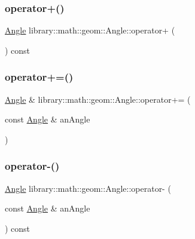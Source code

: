 \mbox{\label{classlibrary_1_1math_1_1geom_1_1_angle_a184ea8e3b505102eebb66d24e09f242c}} 
\subsubsection{\texorpdfstring{operator+()}{operator+()}\hspace{0.1cm}{\footnotesize\ttfamily [2/2]}}
{\footnotesize\ttfamily \hyperlink{classlibrary_1_1math_1_1geom_1_1_angle}{Angle} library\+::math\+::geom\+::\+Angle\+::operator+ (\begin{DoxyParamCaption}{ }\end{DoxyParamCaption}) const}

\mbox{\label{classlibrary_1_1math_1_1geom_1_1_angle_a67e2cbe3892df18f186e3f678575b197}} 
\subsubsection{\texorpdfstring{operator+=()}{operator+=()}}
{\footnotesize\ttfamily \hyperlink{classlibrary_1_1math_1_1geom_1_1_angle}{Angle} \& library\+::math\+::geom\+::\+Angle\+::operator+= (\begin{DoxyParamCaption}\item[{const \hyperlink{classlibrary_1_1math_1_1geom_1_1_angle}{Angle} \&}]{an\+Angle }\end{DoxyParamCaption})}

\mbox{\label{classlibrary_1_1math_1_1geom_1_1_angle_a9ea3a5d5b6e5e2dd1561136255ad4bb3}} 
\subsubsection{\texorpdfstring{operator-\/()}{operator-()}\hspace{0.1cm}{\footnotesize\ttfamily [1/2]}}
{\footnotesize\ttfamily \hyperlink{classlibrary_1_1math_1_1geom_1_1_angle}{Angle} library\+::math\+::geom\+::\+Angle\+::operator-\/ (\begin{DoxyParamCaption}\item[{const \hyperlink{classlibrary_1_1math_1_1geom_1_1_angle}{Angle} \&}]{an\+Angle }\end{DoxyParamCaption}) const}

